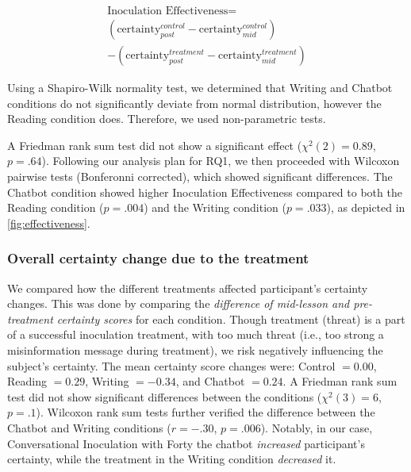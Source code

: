 \documentclass[sigconf]{acmart}
\begin{document}
\begin{equation}
\label{eq:Inoculation_Effectiveness}
\begin{gathered}
\text{Inoculation Effectiveness} = \\
(\text{certainty}^{control}_{post} - \text{certainty}^{control}_{mid}) \\
- (\text{certainty}^{treatment}_{post} - \text{certainty}^{treatment}_{mid})
\end{gathered}
\end{equation}

Using a Shapiro-Wilk normality test, we determined that Writing and Chatbot conditions do not significantly deviate from normal distribution, however the Reading condition does.
Therefore, we used non-parametric tests. 

A Friedman rank sum test did not show a significant effect ($\chi^2(2) = 0.89$, $p = .64$).
Following our analysis plan for RQ1, we then proceeded with Wilcoxon pairwise tests (Bonferonni corrected), which showed significant differences.
The Chatbot condition showed higher Inoculation Effectiveness compared to both the Reading condition ($p = .004$) and the Writing condition ($p = .033$), as depicted in \autoref{fig:effectiveness}.

\subsubsection{Overall certainty change due to the treatment}

We compared how the different treatments affected participant's certainty changes. 
This was done by comparing the \textit{difference of mid-lesson and pre-treatment certainty scores} for each condition.
Though treatment (threat) is a part of a successful inoculation treatment, with too much threat (i.e., too strong a misinformation message during treatment), we risk negatively influencing the subject's certainty.
The mean certainty score changes were: Control $=0.00$, Reading $=0.29$, Writing $=-0.34$, and Chatbot $=0.24$. 
A Friedman rank sum test did not show significant differences between the conditions ($\chi^2(3)=6$, $p=.1$).
Wilcoxon rank sum tests further verified the difference between the Chatbot and Writing conditions ($r=-.30$, $p=.006$). Notably, in our case, Conversational Inoculation with Forty the chatbot \textit{increased} participant's certainty, while the treatment in the Writing condition \textit{decreased} it.
\end{document}
